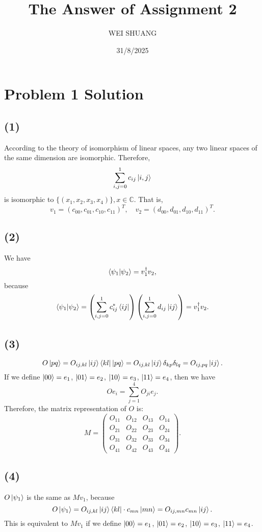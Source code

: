 \documentclass[12pt]{article}
\title{The Answer of Assignment 2}
\author{WEI SHUANG}
\date{31/8/2025}
\begin{document}
\maketitle

\section*{Problem 1 Solution}

\subsection*{(1)}
According to the theory of isomorphism of linear spaces, any two linear spaces of the same dimension are isomorphic. Therefore, 
\[
\sum_{i,j=0}^{1}c_{ij}\ket{i,j}
\]
is isomorphic to $\{(x_1,x_2,x_3,x_4)\}, x\in \mathbb{C}$. That is,
\[
v_1=(c_{00},c_{01},c_{10},c_{11})^T,\quad v_2=(d_{00},d_{01},d_{10},d_{11})^T.
\]

\subsection*{(2)}
We have
\[
\braket{\psi_1|\psi_2}=v_1^\dagger v_2,
\]
because
\[
\braket{\psi_1|\psi_2}=
\left(\sum_{i,j=0}^1c_{ij}^*\bra{ij}\right)
\left(\sum_{i,j=0}^{1}d_{ij}\ket{ij}\right)
= v_1^\dagger v_2.
\]

\subsection*{(3)}
\[
O\ket{pq}=O_{ij,kl}\ket{ij}\bra{kl}\ket{pq}
=O_{ij,kl}\ket{ij}\delta_{kp}\delta_{lq}
=O_{ij,pq}\ket{ij}.
\]
If we define $\ket{00}=e_1$, $\ket{01}=e_2$, $\ket{10}=e_3$, $\ket{11}=e_4$, then we have
\[
Oe_i=\sum_{j=1}^4O_{ji}e_j.
\]
Therefore, the matrix representation of $O$ is:
\[
M=\begin{pmatrix}
O_{11} & O_{12} & O_{13} & O_{14} \\
O_{21} & O_{22} & O_{23} & O_{24} \\
O_{31} & O_{32} & O_{33} & O_{34} \\
O_{41} & O_{42} & O_{43} & O_{44}
\end{pmatrix}.
\]

\subsection*{(4)}
$O\ket{\psi_1}$ is the same as $Mv_1$, because
\[
O\ket{\psi_1}
=O_{ij,kl}\ket{ij}\bra{kl}\cdot c_{mn}\ket{mn}
=O_{ij,mn}c_{mn}\ket{ij}.
\]
This is equivalent to $Mv_1$ if we define $\ket{00}=e_1$, $\ket{01}=e_2$, $\ket{10}=e_3$, $\ket{11}=e_4$.
\end{document}
